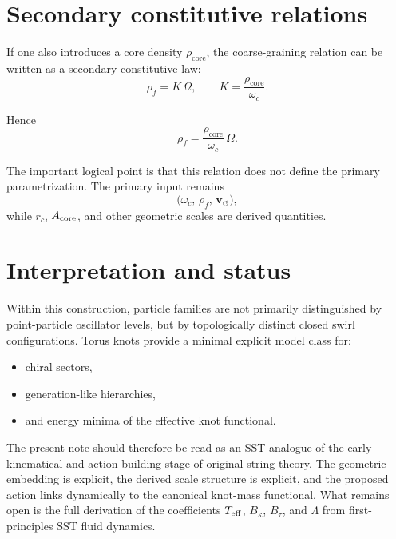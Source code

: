 \documentclass[12pt,a4paper]{article}
\begin{document}
    \section{Secondary constitutive relations}
        
        If one also introduces a core density \(\rho_{\text{core}}\), the coarse-graining relation can be written as a secondary constitutive law:
        \begin{equation}
            \rho_{\!f} = K\,\Omega,
            \qquad
            K = \frac{\rho_{\text{core}}}{\omega_c}.
        \end{equation}
        
        Hence
        \begin{equation}
            \rho_{\!f} = \frac{\rho_{\text{core}}}{\omega_c}\,\Omega.
        \end{equation}
        
        The important logical point is that this relation does not define the primary parametrization. The primary input remains
        \[
            \bigl(\omega_c,\,\rho_{\!f},\,\mathbf{v}_{\!\boldsymbol{\circlearrowleft}}\bigr),
        \]
        while \(r_c\), \(A_{\rm core}\), and other geometric scales are derived quantities.
    
    \section{Interpretation and status}
        
        Within this construction, particle families are not primarily distinguished by point-particle oscillator levels, but by topologically distinct closed swirl configurations. Torus knots provide a minimal explicit model class for:
        \begin{itemize}
            \item chiral sectors,
            \item generation-like hierarchies,
            \item and energy minima of the effective knot functional.
        \end{itemize}
        
        The present note should therefore be read as an SST analogue of the early kinematical and action-building stage of original string theory. The geometric embedding is explicit, the derived scale structure is explicit, and the proposed action links dynamically to the canonical knot-mass functional. What remains open is the full derivation of the coefficients \(T_{\rm eff}\), \(B_\kappa\), \(B_\tau\), and \(\Lambda\) from first-principles SST fluid dynamics.
        
\end{document}
